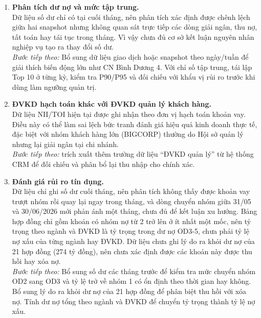 \documentclass[12pt]{eDA_conquer2026}
\begin{document}
\begin{enumerate}[label=\textbf{\arabic*.}, leftmargin=0.8cm]

    \item \textbf{Phân tích dư nợ và mức tập trung.}\\
    Dữ liệu số dư chỉ có tại cuối tháng, nên phân tích xác định được chênh lệch giữa hai snapshot nhưng không quan sát trực tiếp các dòng giải ngân, thu nợ, tất toán hay tái tục trong tháng. Vì vậy chưa đủ cơ sở kết luận nguyên nhân nghiệp vụ tạo ra thay đổi số dư.\\
    \textit{Bước tiếp theo:} Bổ sung dữ liệu giao dịch hoặc snapshot theo ngày/tuần để giải thích biến động lớn như CN Bình Dương 4. Với chỉ số tập trung, tái lập Top 10 ở từng kỳ, kiểm tra P90/P95 và đối chiếu với khẩu vị rủi ro trước khi dùng làm ngưỡng quản trị.

    \item \textbf{ĐVKD hạch toán khác với ĐVKD quản lý khách hàng.}\\
    Dữ liệu NII/TOI hiện tại được ghi nhận theo đơn vị hạch toán khoản vay. Điều này có thể làm sai lệch bức tranh đánh giá hiệu quả kinh doanh thực tế, đặc biệt với nhóm khách hàng lớn (BIGCORP) thường do Hội sở quản lý nhưng lại giải ngân tại chi nhánh.\\
    \textit{Bước tiếp theo:} trích xuất thêm trường dữ liệu ``ĐVKD quản lý'' từ hệ thống CRM để đối chiếu và phân bổ lại thu nhập cho chính xác.

    \item \textbf{Đánh giá rủi ro tín dụng.}\\
    Dữ liệu chỉ ghi số dư cuối tháng, nên phân tích không thấy được khoản vay trượt nhóm rồi quay lại ngay trong tháng, và dòng chuyển nhóm giữa 31/05 và 30/06/2026 mới phản ánh một tháng, chưa đủ để kết luận xu hướng. Bảng hợp đồng chỉ gồm khoản có nhóm nợ từ 2 trở lên ở ít nhất một mốc, nên tỷ trọng theo ngành và ĐVKD là tỷ trọng trong dư nợ OD3-5, chưa phải tỷ lệ nợ xấu của từng ngành hay ĐVKD. Dữ liệu chưa ghi lý do ra khỏi dư nợ của 21 hợp đồng (274 tỷ đồng), nên chưa xác định được các khoản này được thu hồi hay xóa nợ.\\
    \textit{Bước tiếp theo:} Bổ sung số dư các tháng trước để kiểm tra mức chuyển nhóm OD2 sang OD3 và tỷ lệ trở về nhóm 1 có ổn định theo thời gian hay không. Bổ sung lý do ra khỏi dư nợ của 21 hợp đồng để phân biệt thu hồi với xóa nợ. Tính dư nợ tổng theo ngành và ĐVKD để chuyển tỷ trọng thành tỷ lệ nợ xấu.

\end{enumerate}
\end{document}
